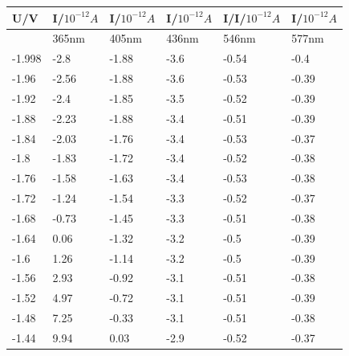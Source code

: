 \documentclass[a4paper]{ltxdoc}
\begin{document}
\small{
    \begin{longtable}{|l|l|l|l|l|l|}
        \hline
        U/V    & I/$10^{-12}A$ & I/$10^{-12}A$ & I/$10^{-12}A$ & I/I/$10^{-12}A$ & I/$10^{-12}A$ \\ \hline
        ~      & 365nm         & 405nm         & 436nm         & 546nm           & 577nm         \\ \hline
        -1.998 & -2.8          & -1.88         & -3.6          & -0.54           & -0.4          \\ \hline
        -1.96  & -2.56         & -1.88         & -3.6          & -0.53           & -0.39         \\ \hline
        -1.92  & -2.4          & -1.85         & -3.5          & -0.52           & -0.39         \\ \hline
        -1.88  & -2.23         & -1.88         & -3.4          & -0.51           & -0.39         \\ \hline
        -1.84  & -2.03         & -1.76         & -3.4          & -0.53           & -0.37         \\ \hline
        -1.8   & -1.83         & -1.72         & -3.4          & -0.52           & -0.38         \\ \hline
        -1.76  & -1.58         & -1.63         & -3.4          & -0.53           & -0.38         \\ \hline
        -1.72  & -1.24         & -1.54         & -3.3          & -0.52           & -0.37         \\ \hline
        -1.68  & -0.73         & -1.45         & -3.3          & -0.51           & -0.38         \\ \hline
        -1.64  & 0.06          & -1.32         & -3.2          & -0.5            & -0.39         \\ \hline
        -1.6   & 1.26          & -1.14         & -3.2          & -0.5            & -0.39         \\ \hline
        -1.56  & 2.93          & -0.92         & -3.1          & -0.51           & -0.38         \\ \hline
        -1.52  & 4.97          & -0.72         & -3.1          & -0.51           & -0.39         \\ \hline
        -1.48  & 7.25          & -0.33         & -3.1          & -0.51           & -0.38         \\ \hline
        -1.44  & 9.94          & 0.03          & -2.9          & -0.52           & -0.37         \\ \hline

\end{longtable}}
\end{document}
